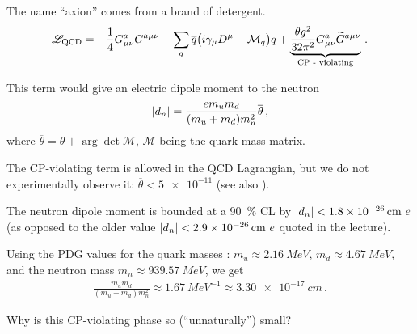 \documentclass[main.tex]{subfiles}
\begin{document}

The name ``axion'' comes from a brand of detergent. 
%
\begin{align}
\mathscr{L} _{\text{QCD}}
= - \frac{1}{4} G^{a}_{\mu \nu }
G^{a \mu \nu }
+ \sum _{q} 
\overline{q} \qty(i \gamma_{\mu } D^{\mu } - \mathcal{M}_q) q 
+
\underbrace{\frac{\theta g^2}{32 \pi^2} G^{a}_{\mu \nu }
\widetilde{G}^{a \mu \nu }}_{\text{CP - violating}}
\,.
\end{align}


This term would give an electric dipole moment to the neutron 
%
\begin{align}
\abs{d_n} = \frac{e m_u m_d}{(m_u + m_d) m_n^2} \overline{\theta}
\,,
\end{align}
%
where \(\overline{\theta} = \theta + \arg \det \mathcal{M}\), \(\mathcal{M}\) being the quark mass matrix. 

The CP-violating term is allowed in the QCD Lagrangian, but we do not experimentally observe it: \(\overline{\theta} < \num{5e-11}\) \cite{chadha-dayAxionDarkMatter2021} (see also \textcite[]{kolbEarlyUniverse1994}).

\begin{extracontent}
The neutron dipole moment is bounded at a \SI{90}{\percent} CL by \(\abs{d_n} < \SI{1.8e-26}{cm}\ e\) \cite{groupReviewParticlePhysics2020} (as opposed to the older value \(\abs{d_n} < \SI{2.9e-26}{cm}\ e\) quoted in the lecture). 

Using the PDG values for the quark masses \cite[]{groupReviewParticlePhysics2020}: \(m_u \approx \SI{2.16}{MeV}\), \(m_d \approx \SI{4.67}{MeV}\), and the neutron mass \(m_n \approx \SI{939.57}{MeV}\), we get 
%
\begin{align}
\frac{m_u m_d}{(m_u + m_d) m_n^2} \approx \SI{1.67}{MeV^{-1}} \approx \SI{3.30e-17}{cm}
\,.
\end{align}
\end{extracontent}


Why is this CP-violating phase so (``unnaturally'') small? 
\end{document}
